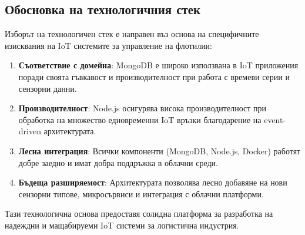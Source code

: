 \subsection{Обосновка на технологичния стек}

Изборът на технологичен стек е направен въз основа на специфичните изисквания на IoT системите за управление на флотилии:

\begin{enumerate}
    \item \textbf{Съответствие с домейна}: MongoDB е широко използвана в IoT приложения поради своята гъвкавост и производителност при работа с времеви серии и сензорни данни.

    \item \textbf{Производителност}: Node.js осигурява висока производителност при обработка на множество едновременни IoT връзки благодарение на event-driven архитектурата.

    \item \textbf{Лесна интеграция}: Всички компоненти (MongoDB, Node.js, Docker) работят добре заедно и имат добра поддръжка в облачни среди.

    \item \textbf{Бъдеща разширяемост}: Архитектурата позволява лесно добавяне на нови сензорни типове, микросървиси и интеграция с облачни платформи.
\end{enumerate}

Тази технологична основа предоставя солидна платформа за разработка на надеждни и мащабируеми IoT системи за логистична индустрия.